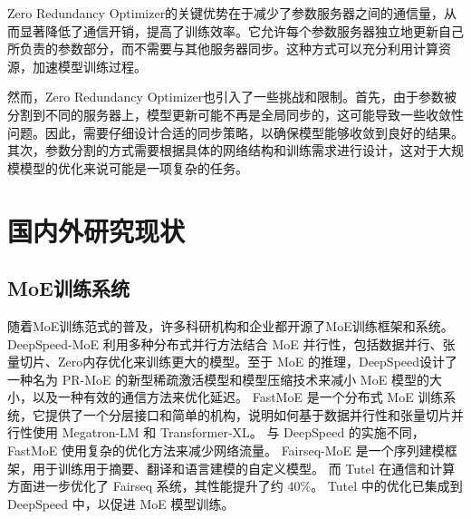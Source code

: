 Zero Redundancy Optimizer的关键优势在于减少了参数服务器之间的通信量，从而显著降低了通信开销，提高了训练效率。它允许每个参数服务器独立地更新自己所负责的参数部分，而不需要与其他服务器同步。这种方式可以充分利用计算资源，加速模型训练过程。

然而，Zero Redundancy Optimizer也引入了一些挑战和限制。首先，由于参数被分割到不同的服务器上，模型更新可能不再是全局同步的，这可能导致一些收敛性问题。因此，需要仔细设计合适的同步策略，以确保模型能够收敛到良好的结果。其次，参数分割的方式需要根据具体的网络结构和训练需求进行设计，这对于大规模模型的优化来说可能是一项复杂的任务。

\section{国内外研究现状}

\subsection{MoE训练系统}
随着MoE训练范式的普及，许多科研机构和企业都开源了MoE训练框架和系统。 
% 
DeepSpeed-MoE 利用多种分布式并行方法结合 MoE 并行性，包括数据并行、张量切片、Zero内存优化来训练更大的模型。至于 MoE 的推理，DeepSpeed设计了一种名为 PR-MoE 的新型稀疏激活模型和模型压缩技术来减小 MoE 模型的大小，以及一种有效的通信方法来优化延迟。 
% 
FastMoE 是一个分布式 MoE 训练系统，它提供了一个分层接口和简单的机构，说明如何基于数据并行性和张量切片并行性使用 Megatron-LM 和 Transformer-XL。
% 
与 DeepSpeed 的实施不同，FastMoE 使用复杂的优化方法来减少网络流量。
% 
Fairseq-MoE  是一个序列建模框架，用于训练用于摘要、翻译和语言建模的自定义模型。
% 
而 Tutel 在通信和计算方面进一步优化了 Fairseq 系统，其性能提升了约 40\%。
Tutel 中的优化已集成到 DeepSpeed 中，以促进 MoE 模型训练。

